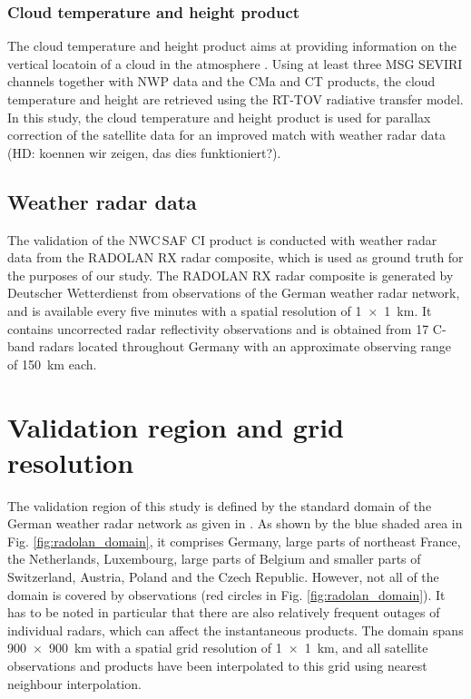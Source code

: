 \subsubsection{Cloud temperature and height product}
The cloud temperature and height product aims at providing information on the vertical locatoin of a cloud in the atmosphere \citep{NWCSAFWolken2014}. Using at least three MSG SEVIRI channels together with NWP data and the CMa and CT products, the cloud temperature and height are retrieved using the RT-TOV radiative transfer model. In this study, the cloud temperature and height product is used for parallax correction of the satellite data for an improved match with weather radar data (HD: koennen wir zeigen, das dies funktioniert?).

\subsection{Weather radar data}
The validation of the NWC\,SAF CI product is conducted with weather radar data from the RADOLAN RX radar composite, which is used as ground truth for the purposes of our study. The RADOLAN RX radar composite is generated by Deutscher Wetterdienst from observations of the German weather radar network, and is available every five minutes with a spatial resolution of \SI{1 x 1}{\kilo\metre}.  It contains uncorrected radar reflectivity observations and is obtained from 17 C-band radars located throughout Germany with an approximate observing range of \SI{150}{km} each\citep{RADOLANkurz2018}.

\section{Validation region and grid resolution}
The validation region of this study is defined by the standard domain of the German weather radar network as given in \citet{RADOLANkurz2018}. As shown by the blue shaded area in Fig. \ref{fig:radolan_domain}, it comprises Germany, large parts of northeast France, the Netherlands, Luxembourg, large parts of Belgium and smaller parts of Switzerland, Austria, Poland and the Czech Republic. However, not all of the domain is covered by observations (red circles in Fig. \ref{fig:radolan_domain}). It has to be noted in particular that there are also relatively frequent outages of individual radars, which can affect the instantaneous products. The domain spans \SI{900 x 900}{\kilo\metre} with a spatial grid resolution of \SI{1 x 1}{\kilo\metre}, and all satellite observations and products have been interpolated to this grid using nearest neighbour interpolation.

